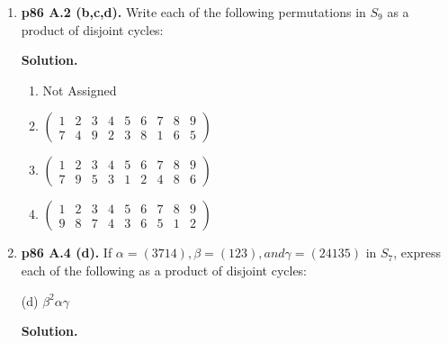 \documentclass[11pt]{article}
\begin{document}
\begin{enumerate}
\item {\bfseries p86 A.2 (b,c,d).} Write each of the following permutations in $S_9$ as a product of disjoint cycles:
  
	{\bfseries Solution.}
	
	\begin{enumerate}
	
		\item Not Assigned
	
		\item 
		$\begin{pmatrix}
			1 & 2 & 3 & 4 & 5 & 6 & 7 & 8 & 9 \\
			7 & 4 & 9 & 2 & 3 & 8 & 1 & 6 & 5
		\end{pmatrix}$
		
		\item 
		$\begin{pmatrix}
			1 & 2 & 3 & 4 & 5 & 6 & 7 & 8 & 9 \\
			7 & 9 & 5 & 3 & 1 & 2 & 4 & 8 & 6
		\end{pmatrix}$
		
		\item 
		$\begin{pmatrix}
			1 & 2 & 3 & 4 & 5 & 6 & 7 & 8 & 9 \\
			9 & 8 & 7 & 4 & 3 & 6 & 5 & 1 & 2
		\end{pmatrix}$
  
  \end{enumerate}

\item {\bfseries p86 A.4 (d).} If $\alpha = (3714), \beta = (123), and \gamma = (24135)$ in $S_7$, express each of the following as a product of disjoint cycles:

	(d) $\beta^2\alpha\gamma$
  
	{\bfseries Solution.}
  
\newpage

\end{enumerate}
\end{document}
